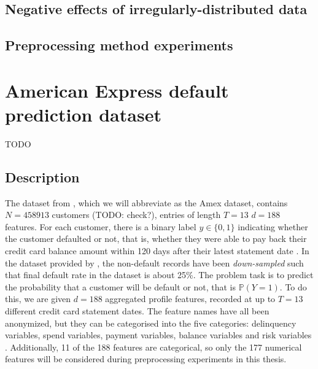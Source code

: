 \documentclass{statsmsc}
\begin{document}
{%

\subsection{Negative effects of irregularly-distributed data}%
\label{sub:Negative effects of irregularly-distributed data}



\subsection{Preprocessing method experiments}%
\label{sub:Preprocessing method experiments}




\section{American Express default prediction dataset}%
\label{sec:American Express default prediction dataset}%

TODO

\subsection{Description}%
\label{sub:Description}

The dataset from \cite{amex-data}, which we will abbreviate as the Amex
dataset, contains $N=458913$ customers (TODO: check?), entries of length $T=13$
$d=188$ features.  For each customer, there is a binary label $y \in \{0,1\}$
indicating whether the customer defaulted or not, that is, whether they were
able to pay back their credit card balance amount within 120 days after their
latest statement date \citep{amex-data}.  In the dataset provided by
\cite{amex-data}, the non-default records have been \textit{down-sampled} such
that final default rate in the dataset is about 25\%. The problem task is to
predict the probability that a customer will be default or not, that is
$\mathbb{P}(Y=1)$.  To do this, we are given $d=188$ aggregated profile
features, recorded at up to $T=13$ different credit card statement dates.  The
feature names have all been anonymized, but they can be categorised into the
five categories: delinquency variables, spend variables, payment variables,
balance variables and risk variables \citep{amex-data}.  Additionally, 11 of
the 188 features are categorical, so only the 177 numerical features will be
considered during preprocessing experiments in this thesis.


}
\end{document}

